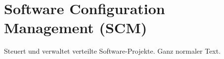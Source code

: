 \chapter{Software Configuration Management (\acs{SCM})}
Steuert und verwaltet verteilte Software-Projekte.
Ganz normaler Text.


